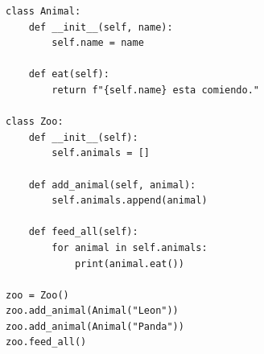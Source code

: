 \begin{lstlisting}[caption={Clase Zoo administrando una colección polimórfica de animales.}, label={list:zoo_animales}]
class Animal:
    def __init__(self, name):
        self.name = name

    def eat(self):
        return f"{self.name} esta comiendo."

class Zoo:
    def __init__(self):
        self.animals = []

    def add_animal(self, animal):
        self.animals.append(animal)

    def feed_all(self):
        for animal in self.animals:
            print(animal.eat())

zoo = Zoo()
zoo.add_animal(Animal("Leon"))
zoo.add_animal(Animal("Panda"))
zoo.feed_all()
\end{lstlisting}
